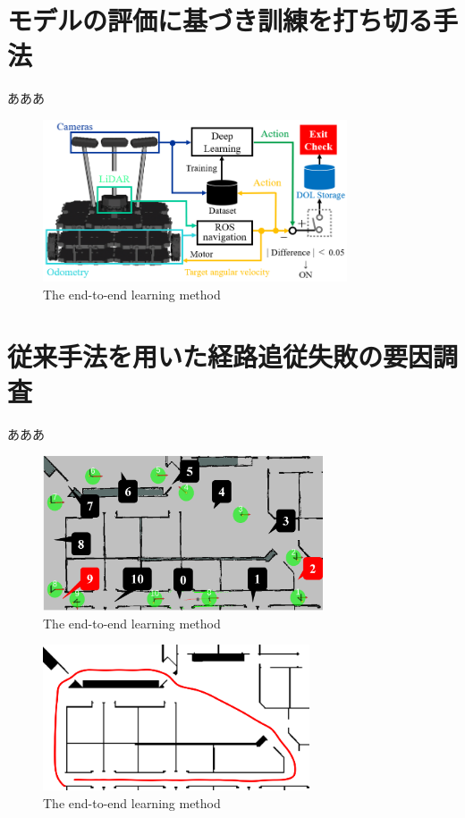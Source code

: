 \documentclass{jarticle}
\begin{document}
\section{モデルの評価に基づき訓練を打ち切る手法}
あああ\\

\begin{figure}[h!]
  \centering
   \includegraphics[height=48mm]{./png/moderu.png}
   \caption{The end-to-end learning method}
\end{figure}

\newpage

\section{従来手法を用いた経路追従失敗の要因調査}
あああ



\begin{figure}[h!]
  \centering
   \includegraphics[height=46mm]{./png/location.png}
   \caption{The end-to-end learning method}
\end{figure}


\begin{figure}[h!]
  \centering
   \includegraphics[height=43mm]{./png/failed.png}
   \caption{The end-to-end learning method}
\end{figure}
\end{document}
